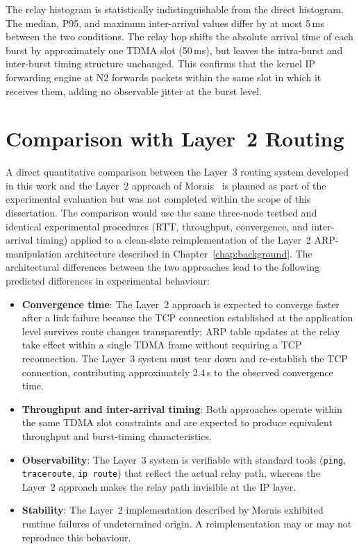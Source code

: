 The relay histogram is statistically indistinguishable from the direct
histogram. The median, P95, and maximum inter-arrival values differ by at
most 5\,ms between the two conditions. The relay hop shifts the absolute
arrival time of each burst by approximately one TDMA slot (50\,ms), but
leaves the intra-burst and inter-burst timing structure unchanged. This
confirms that the kernel IP forwarding engine at N2 forwards packets
within the same slot in which it receives them, adding no observable
jitter at the burst level.


\section{Comparison with Layer~2 Routing}
\label{sec:comparison}

A direct quantitative comparison between the Layer~3 routing system
developed in this work and the Layer~2 approach of
Morais~\cite{morais2024synchronization} is planned as part of the
experimental evaluation but was not completed within the scope of this
dissertation. The comparison would use the same three-node testbed and
identical experimental procedures (RTT, throughput, convergence, and
inter-arrival timing) applied to a clean-slate reimplementation of the
Layer~2 ARP-manipulation architecture described in
Chapter~\ref{chap:background}. The architectural differences between the
two approaches lead to the following predicted differences in experimental
behaviour:

\begin{itemize}
  \item \textbf{Convergence time}: The Layer~2 approach is expected to
  converge faster after a link failure because the TCP connection
  established at the application level survives route changes transparently;
  ARP table updates at the relay take effect within a single TDMA frame
  without requiring a TCP reconnection. The Layer~3 system must tear down
  and re-establish the TCP connection, contributing approximately 2.4\,s
  to the observed convergence time.

  \item \textbf{Throughput and inter-arrival timing}: Both approaches
  operate within the same TDMA slot constraints and are expected to produce
  equivalent throughput and burst-timing characteristics.

  \item \textbf{Observability}: The Layer~3 system is verifiable with
  standard tools (\texttt{ping}, \texttt{traceroute}, \texttt{ip route})
  that reflect the actual relay path, whereas the Layer~2 approach makes
  the relay path invisible at the IP layer.

  \item \textbf{Stability}: The Layer~2 implementation described by
  Morais exhibited runtime failures of undetermined origin. A
  reimplementation may or may not reproduce this behaviour.
\end{itemize}

